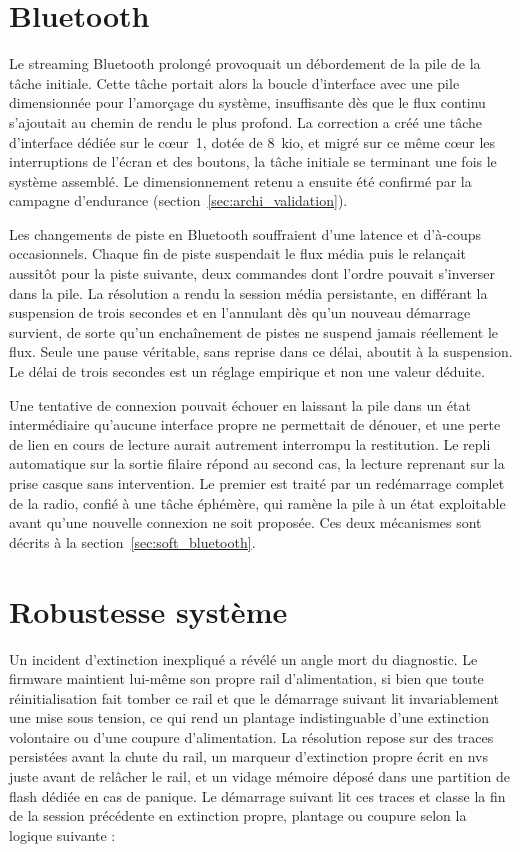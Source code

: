 \section{Bluetooth}

Le streaming Bluetooth prolongé provoquait un débordement de la pile de la tâche initiale. Cette tâche portait alors la boucle d'interface avec une pile dimensionnée pour l'amorçage du système, insuffisante dès que le flux continu s'ajoutait au chemin de rendu le plus profond. La correction a créé une tâche d'interface dédiée sur le cœur~1, dotée de 8~kio, et migré sur ce même cœur les interruptions de l'écran et des boutons, la tâche initiale se terminant une fois le système assemblé. Le dimensionnement retenu a ensuite été confirmé par la campagne d'endurance (section~\ref{sec:archi_validation}).

Les changements de piste en Bluetooth souffraient d'une latence et d'à-coups occasionnels. Chaque fin de piste suspendait le flux média puis le relançait aussitôt pour la piste suivante, deux commandes dont l'ordre pouvait s'inverser dans la pile. La résolution a rendu la session média persistante, en différant la suspension de trois secondes et en l'annulant dès qu'un nouveau démarrage survient, de sorte qu'un enchaînement de pistes ne suspend jamais réellement le flux. Seule une pause véritable, sans reprise dans ce délai, aboutit à la suspension. Le délai de trois secondes est un réglage empirique et non une valeur déduite.

Une tentative de connexion pouvait échouer en laissant la pile dans un état intermédiaire qu'aucune interface propre ne permettait de dénouer, et une perte de lien en cours de lecture aurait autrement interrompu la restitution. Le repli automatique sur la sortie filaire répond au second cas, la lecture reprenant sur la prise casque sans intervention. Le premier est traité par un redémarrage complet de la radio, confié à une tâche éphémère, qui ramène la pile à un état exploitable avant qu'une nouvelle connexion ne soit proposée. Ces deux mécanismes sont décrits à la section~\ref{sec:soft_bluetooth}.

\section{Robustesse système}

Un incident d'extinction inexpliqué a révélé un angle mort du diagnostic. Le firmware maintient lui-même son propre rail d'alimentation, si bien que toute réinitialisation fait tomber ce rail et que le démarrage suivant lit invariablement une mise sous tension, ce qui rend un plantage indistinguable d'une extinction volontaire ou d'une coupure d'alimentation. La résolution repose sur des traces persistées avant la chute du rail, un marqueur d'extinction propre écrit en \gls{nvs} juste avant de relâcher le rail, et un vidage mémoire déposé dans une partition de flash dédiée en cas de panique. Le démarrage suivant lit ces traces et classe la fin de la session précédente en extinction propre, plantage ou coupure selon la logique suivante :

